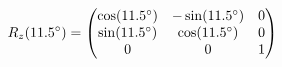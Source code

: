 \documentclass[preview]{standalone}
\begin{document}
\begin{align*}
\special{dvisvgm:raw <g id='unique000'>}R_z(11.5^\circ) = \begin{pmatrix} \cos(11.5^\circ) & -\sin(11.5^\circ) & 0 \\ \sin(11.5^\circ) & \cos(11.5^\circ) & 0 \\ 0 & 0 & 1 \end{pmatrix}\special{dvisvgm:raw </g>}
\end{align*}
\end{document}
